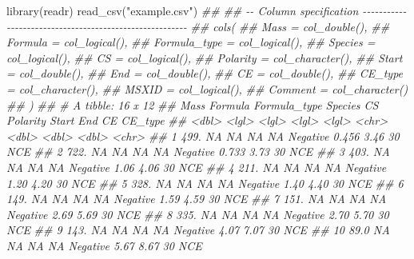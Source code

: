 \documentclass[]{article}
\newcommand{\hlstr}[1]{\textcolor[rgb]{0.251,0.627,0.251}{#1}}%
\newcommand{\hlcom}[1]{\textcolor[rgb]{0.502,0.502,0.502}{\textit{#1}}}%
\newcommand{\hlstd}[1]{\textcolor[rgb]{0.251,0.251,0.251}{#1}}%
\newenvironment{Shaded}{\begin{myshaded}}{\end{myshaded}}
\newcommand{\StringTok}[1]{\hlstr{#1}}
\newcommand{\DocumentationTok}[1]{\hlcom{#1}}
\newcommand{\FunctionTok}[1]{\hlstd{#1}}
\newcommand{\NormalTok}[1]{\hlstd{#1}}
\begin{document}
\begin{Shaded}
\begin{Highlighting}[]
\FunctionTok{library}\NormalTok{(readr)}
\FunctionTok{read\_csv}\NormalTok{(}\StringTok{"example.csv"}\NormalTok{)}
\DocumentationTok{\#\# }
\DocumentationTok{\#\# {-}{-} Column specification {-}{-}{-}{-}{-}{-}{-}{-}{-}{-}{-}{-}{-}{-}{-}{-}{-}{-}{-}{-}{-}{-}{-}{-}{-}{-}{-}{-}{-}{-}{-}{-}{-}{-}{-}{-}{-}{-}{-}{-}{-}{-}{-}{-}{-}{-}{-}{-}{-}{-}{-}{-}{-}{-}{-}{-}}
\DocumentationTok{\#\# cols(}
\DocumentationTok{\#\#   Mass = col\_double(),}
\DocumentationTok{\#\#   Formula = col\_logical(),}
\DocumentationTok{\#\#   Formula\_type = col\_logical(),}
\DocumentationTok{\#\#   Species = col\_logical(),}
\DocumentationTok{\#\#   CS = col\_logical(),}
\DocumentationTok{\#\#   Polarity = col\_character(),}
\DocumentationTok{\#\#   Start = col\_double(),}
\DocumentationTok{\#\#   End = col\_double(),}
\DocumentationTok{\#\#   CE = col\_double(),}
\DocumentationTok{\#\#   CE\_type = col\_character(),}
\DocumentationTok{\#\#   MSXID = col\_logical(),}
\DocumentationTok{\#\#   Comment = col\_character()}
\DocumentationTok{\#\# )}
\DocumentationTok{\#\# \# A tibble: 16 x 12}
\DocumentationTok{\#\#     Mass Formula Formula\_type Species CS    Polarity  Start   End    CE CE\_type}
\DocumentationTok{\#\#    \textless{}dbl\textgreater{} \textless{}lgl\textgreater{}   \textless{}lgl\textgreater{}        \textless{}lgl\textgreater{}   \textless{}lgl\textgreater{} \textless{}chr\textgreater{}     \textless{}dbl\textgreater{} \textless{}dbl\textgreater{} \textless{}dbl\textgreater{} \textless{}chr\textgreater{}  }
\DocumentationTok{\#\#  1 499.  NA      NA           NA      NA    Negative  0.456  3.46    30 NCE    }
\DocumentationTok{\#\#  2 722.  NA      NA           NA      NA    Negative  0.733  3.73    30 NCE    }
\DocumentationTok{\#\#  3 403.  NA      NA           NA      NA    Negative  1.06   4.06    30 NCE    }
\DocumentationTok{\#\#  4 211.  NA      NA           NA      NA    Negative  1.20   4.20    30 NCE    }
\DocumentationTok{\#\#  5 328.  NA      NA           NA      NA    Negative  1.40   4.40    30 NCE    }
\DocumentationTok{\#\#  6 149.  NA      NA           NA      NA    Negative  1.59   4.59    30 NCE    }
\DocumentationTok{\#\#  7 151.  NA      NA           NA      NA    Negative  2.69   5.69    30 NCE    }
\DocumentationTok{\#\#  8 335.  NA      NA           NA      NA    Negative  2.70   5.70    30 NCE    }
\DocumentationTok{\#\#  9 143.  NA      NA           NA      NA    Negative  4.07   7.07    30 NCE    }
\DocumentationTok{\#\# 10  89.0 NA      NA           NA      NA    Negative  5.67   8.67    30 NCE    }

\end{Highlighting}
\end{Shaded}
\end{document}
